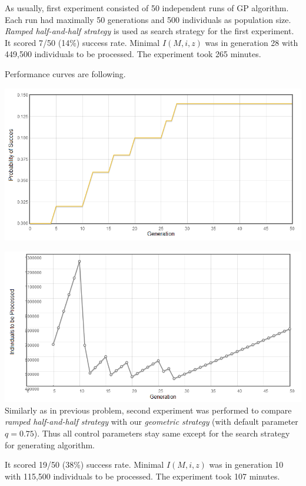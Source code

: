 \documentclass[12pt,a4paper]{report}
\begin{document}
As usually, first experiment consisted of 50 independent runs of GP algorithm.
Each run had maximally 50 generations and 500 individuals as population size.
\textit{Ramped half-and-half strategy} is used as search strategy for the first 
experiment.\\


It scored 7/50 (14\%) success rate. 
Minimal $I(M,i,z)$ was in generation 28 
with 449,500 individuals to be processed.
The experiment took 265 minutes.

Performance curves are following.

\includegraphics[scale=0.65]{reports/Ant/2/probabs.png}

\includegraphics[scale=0.65]{reports/Ant/2/indivs.png}\\

Similarly as in previous problem, second experiment was performed to compare 
\textit{ramped half-and-half strategy} with our
\textit{geometric strategy} (with default parameter $q=0.75$). 
Thus all control parameters stay same except for the 
search strategy for generating algorithm.

It scored 19/50 (38\%) success rate. 
Minimal $I(M,i,z)$ was in generation 10 
with 115,500 individuals to be processed.
The experiment took 107 minutes.\\
\end{document}
